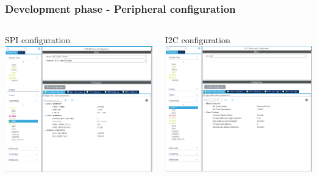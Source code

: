 \documentclass[11pt,xcolor=table,aspectratio=169]{beamer}
\begin{document}
	\begin{frame}
		\frametitle{Development phase - Peripheral configuration}
		\begin{columns}
			\begin{column}{.5\textwidth} 
				SPI configuration
				\centering\includegraphics[width=\textwidth]{media/peripheral.png}
			\end{column}
			\begin{column}{.5\textwidth}
				I2C configuration
				\centering\includegraphics[width=\textwidth]{media/peripheral_2.png}
			\end{column}
		\end{columns}
		
	\end{frame}
\end{document}
